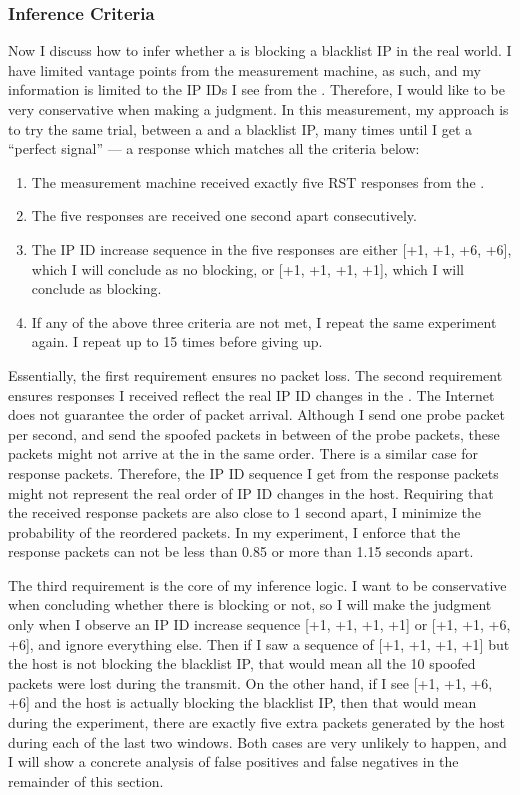 \subsubsection{Inference Criteria}
Now I discuss how to infer whether a {} is blocking a blacklist IP
in the real world. I have limited vantage points from the measurement machine, as
such, and my information is limited to the IP IDs I see from the {}.
Therefore, I would like to be very conservative when making a judgment. In this
measurement, my approach is to try the same trial, between a {} and a
blacklist IP, many times until I get a ``perfect signal'' --- a response
which matches all the criteria below:

\begin{enumerate}
    \item The measurement machine received exactly five RST responses from the {}.
    \item The five responses are received one second apart consecutively.
    \item The IP ID increase sequence in the five responses are either [+1, +1, +6, +6],
    which I will conclude as no blocking, or [+1, +1, +1, +1], which I will
    conclude as blocking.
    \item If any of the above three criteria are not met, I repeat the same experiment
    again. I repeat up to 15 times before giving up.
\end{enumerate}

Essentially, the first requirement ensures no packet loss. The second
requirement ensures responses I received reflect the real IP ID changes in
the {}. The Internet does not guarantee the order of packet arrival.
Although I send one probe packet per second, and send the spoofed
packets in between of the probe packets, these packets might not arrive at
the {} in the same order. There is a similar case for response packets.
Therefore, the IP ID sequence I get from the response packets
might not represent the real order of IP ID changes in the host. Requiring
that
the received response packets are also close to 1 second apart, I minimize
the probability of the reordered packets. In my experiment, I enforce that
the response packets can not be less than 0.85 or more than 1.15 seconds
apart.

The third requirement is the core of my inference logic. I want to be
conservative when concluding whether there is blocking or not, so I will
make the judgment only when I observe an IP ID increase sequence [+1, +1, +1,
+1] or [+1, +1, +6, +6], and ignore everything else. Then if I saw a
sequence of [+1, +1, +1, +1] but the host is not blocking the blacklist IP,
that would mean all the 10 spoofed packets were lost during the transmit. On
the other hand, if I see [+1, +1, +6, +6] and the host is actually blocking
the blacklist IP, then that would mean during the experiment, there are
exactly five extra packets generated by the host during each of the last two
windows. Both cases are very unlikely to happen, and I will show a concrete
analysis of false positives and false negatives in the remainder of this section.


